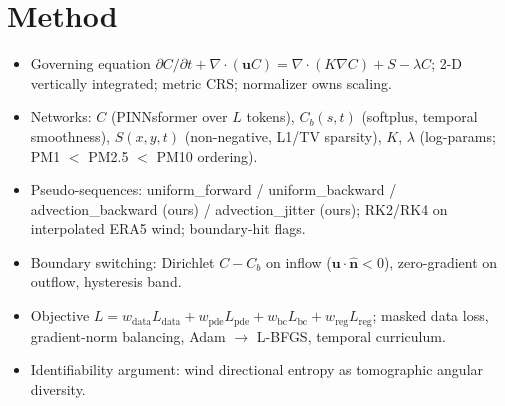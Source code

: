 \section{Method}
\begin{itemize}
  \item Governing equation $\partial C/\partial t + \nabla\cdot(\mathbf{u}C) = \nabla\cdot(K\nabla C) + S - \lambda C$; 2-D vertically integrated; metric CRS; normalizer owns scaling.
  \item Networks: $C$ (PINNsformer over $L$ tokens), $C_b(s,t)$ (softplus, temporal smoothness), $S(x,y,t)$ (non-negative, L1/TV sparsity), $K$, $\lambda$ (log-params; PM1 $<$ PM2.5 $<$ PM10 ordering).
  \item Pseudo-sequences: uniform\_forward / uniform\_backward / advection\_backward (ours) / advection\_jitter (ours); RK2/RK4 on interpolated ERA5 wind; boundary-hit flags.
  \item Boundary switching: Dirichlet $C - C_b$ on inflow ($\mathbf{u}\cdot\hat{\mathbf{n}} < 0$), zero-gradient on outflow, hysteresis band.
  \item Objective $L = w_{\mathrm{data}}L_{\mathrm{data}} + w_{\mathrm{pde}}L_{\mathrm{pde}} + w_{\mathrm{bc}}L_{\mathrm{bc}} + w_{\mathrm{reg}}L_{\mathrm{reg}}$; masked data loss, gradient-norm balancing, Adam $\to$ L-BFGS, temporal curriculum.
  \item Identifiability argument: wind directional entropy as tomographic angular diversity.
\end{itemize}
